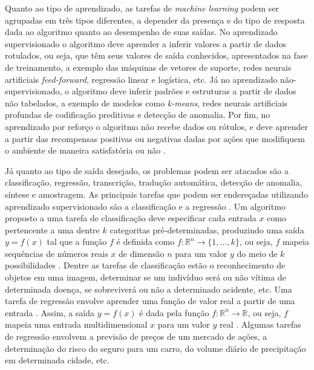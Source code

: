 Quanto ao tipo de aprendizado, as tarefas de \emph{machine learning} podem ser agrupadas em três tipos diferentes, a depender da presença e do tipo de resposta dada ao algoritmo quanto ao desempenho de suas saídas. No aprendizado supervisionado o algoritmo deve aprender a inferir valores a partir de dados rotulados, ou seja, que têm seus valores de saída conhecidos, apresentados na fase de treinamento, a exemplo das máquinas de vetores de suporte, redes neurais artificiais \emph{feed-forward}, regressão linear e logística, etc. Já no aprendizado não-supervisionado, o algoritmo deve inferir padrões e estruturas a partir de dados não tabelados, a exemplo de modelos como \emph{k-means}, redes neurais artificiais profundas de codificação preditivas e detecção de anomalia. Por fim, no aprendizado por reforço o algoritmo não recebe dados ou rótulos, e deve aprender a partir das recompensas positivas ou negativas dadas por ações que modifiquem o ambiente de maneira satisfatória ou não \cite{flach2012machine}.

Já quanto ao tipo de saída desejado, os problemas podem ser atacados são a classificação, regressão, transcrição, tradução automática, detecção de anomalia, síntese e amostragem. As principais tarefas que podem ser endereçadas utilizando aprendizado supervisionado são a classificação e a regressão \cite{flach2012machine}. Um algoritmo proposto a uma tarefa de classificação deve especificar cada entrada $x$ como pertencente a uma dentre $k$ categoritas pré-determinadas, produzindo uma saída $y=f(x)$ tal que a função $f$ é definida como $f: \mathds{R}^n \rightarrow \{1, \ldots, k\}$, ou seja, $f$ mapeia sequências de números reais  $x$ de dimensão $n$ para um valor $y$ do meio de $k$ possibilidades \cite{goodfellow2016deep}. Dentre as tarefas de classificação estão o reconhecimento de objetos em uma imagem, determinar se um indivíduo será ou não vítima de determinada doença, se sobreviverá ou não a determinado acidente, etc. Uma tarefa de regressão envolve aprender uma função de valor real a partir de uma entrada \cite{flach2012machine}. Assim, a saída $y=f(x)$ é dada pela função $f: \mathds{R}^n \rightarrow \mathds{R}$, ou seja, $f$ mapeia uma entrada multidimensional $x$ para um valor $y$ real  \cite{goodfellow2016deep}. Algumas tarefas de regressão envolvem a previsão de preços de um mercado de ações, a determinação do risco do seguro para um carro, do volume diário de precipitação em determinada cidade, etc.

